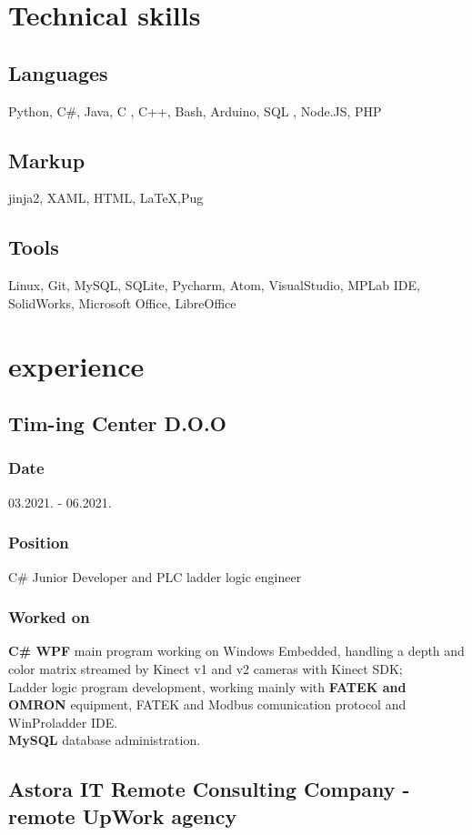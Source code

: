 \documentclass[10pt]{article}
\begin{document}
\section{Technical skills}
\subsection{Languages}
Python, C\#, Java, C , C++, Bash, Arduino, SQL , Node.JS, PHP
\subsection{Markup}
 jinja2, XAML, HTML, \LaTeX,Pug
\subsection{Tools}
Linux, Git, MySQL, SQLite, Pycharm, Atom, VisualStudio, MPLab IDE, SolidWorks,  Microsoft Office,  LibreOffice

\section{experience}
\subsection{\large{Tim-ing Center D.O.O}}
\subsubsection{Date}
03.2021. - 06.2021.
\subsubsection{Position}
C\# Junior Developer and PLC ladder logic engineer
\subsubsection{Worked on}
\textbf{C\# WPF} main program working on Windows Embedded, handling a depth and color matrix streamed by Kinect v1 and v2 cameras with Kinect SDK;\\
Ladder logic program development, working mainly with \textbf{FATEK and OMRON} equipment, FATEK and Modbus comunication protocol and WinProladder IDE.\\
\textbf{MySQL} database administration.\\

\subsection{\large{Astora IT Remote Consulting Company - remote UpWork agency}}
\end{document}
